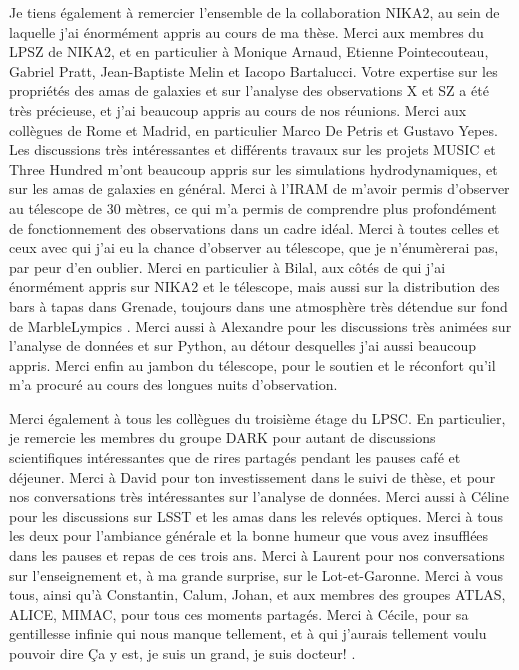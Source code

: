 Je tiens également à remercier l'ensemble de la collaboration NIKA2, au sein de laquelle j'ai énormément appris au cours de ma thèse.
Merci aux membres du LPSZ de NIKA2, et en particulier à Monique Arnaud, Etienne Pointecouteau, Gabriel Pratt, Jean-Baptiste Melin et Iacopo Bartalucci.
Votre expertise sur les propriétés des amas de galaxies et sur l'analyse des observations X et SZ a été très précieuse, et j'ai beaucoup appris au cours de nos réunions.
Merci aux collègues de Rome et Madrid, en particulier Marco De Petris et Gustavo Yepes.
Les discussions très intéressantes et différents travaux sur les projets MUSIC et Three Hundred m'ont beaucoup appris sur les simulations hydrodynamiques, et sur les amas de galaxies en général.
Merci à l'IRAM de m'avoir permis d'observer au télescope de 30 mètres, ce qui m'a permis de comprendre plus profondément de fonctionnement des observations dans un cadre idéal.
Merci à toutes celles et ceux avec qui j'ai eu la chance d'observer au télescope, que je n'énumèrerai pas, par peur d'en oublier.
Merci en particulier à Bilal, aux côtés de qui j'ai énormément appris sur NIKA2 et le télescope, mais aussi sur la distribution des bars à tapas dans Grenade, toujours dans une atmosphère très détendue sur fond de \guillemotleft MarbleLympics \guillemotright.
Merci aussi à Alexandre pour les discussions très animées sur l'analyse de données et sur Python, au détour desquelles j'ai aussi beaucoup appris.
Merci enfin au jambon du télescope, pour le soutien et le réconfort qu'il m'a procuré au cours des longues nuits d'observation.

Merci également à tous les collègues du troisième étage du LPSC.
En particulier, je remercie les membres du groupe DARK pour autant de discussions scientifiques intéressantes que de rires partagés pendant les pauses café et déjeuner.
Merci à David pour ton investissement dans le suivi de thèse, et pour nos conversations très intéressantes sur l'analyse de données.
Merci aussi à Céline pour les discussions sur LSST et les amas dans les relevés optiques.
Merci à tous les deux pour l'ambiance générale et la bonne humeur que vous avez insufflées dans les pauses et repas de ces trois ans.
Merci à Laurent pour nos conversations sur l'enseignement et, à ma grande surprise, sur le Lot-et-Garonne.
Merci à vous tous, ainsi qu'à Constantin, Calum, Johan, et aux membres des groupes ATLAS, ALICE, MIMAC, pour tous ces moments partagés.
Merci à Cécile, pour sa gentillesse infinie qui nous manque tellement, et à qui j'aurais tellement voulu pouvoir dire \guillemotleft Ça y est, je suis un grand, je suis docteur! \guillemotright.


